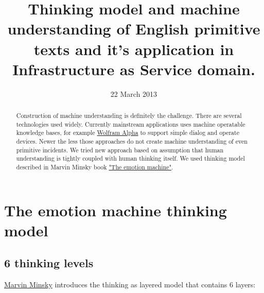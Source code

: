 \documentclass[conference]{IEEEtran}
\begin{document}
\title{Thinking model and machine understanding of English primitive texts and it's application in Infrastructure as Service domain.}

\author{
\and
{}
}

\date{22 March 2013}

\maketitle

\begin{abstract}

Construction of machine understanding is definitely the challenge. There are several technologies used widely.
Currently mainstream applications uses machine operatable knowledge bases, for example \href{http://www.wolframalpha.com}{Wolfram Alpha}\cite{wolfram_alpha} to support simple dialog and operate devices.
Newer the less those approaches do not create machine understanding of even primitive incidents.
We tried new approach based on assumption that human understanding is tightly coupled with human thinking itself.
We used thinking model described in Marvin Minsky book \href{http://en.wikipedia.org/wiki/The_Emotion_Machine}{"The emotion machine"}\cite{minsk}.


\end{abstract}

\section{The emotion machine thinking model}
\subsection{6 thinking levels}

\href{http://web.media.mit.edu/~minsky/E5/eb5.html}{Marvin Minsky} introduces the thinking as layered model that contains 6 layers:
\end{document}
